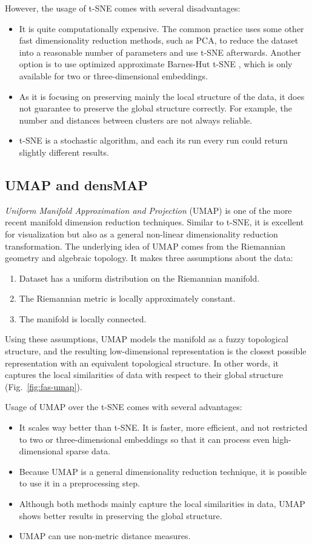 However, the usage of t-SNE comes with several disadvantages:
\begin{itemize}
    \item It is quite computationally expensive. The common practice uses some other fast dimensionality reduction methods, such as PCA, to reduce the dataset into a reasonable number of parameters and use t-SNE afterwards. Another option is to use optimized approximate Barnes-Hut t-SNE \cite{vis:barnes-hut-tsne}, which is only available for two or three-dimensional embeddings.
    \item As it is focusing on preserving mainly the local structure of the data, it does not guarantee to preserve the global structure correctly. For example, the number and distances between clusters are not always reliable.
    \item t-SNE is a stochastic algorithm, and each its run every run could return slightly different results.
\end{itemize}


\subsection{UMAP and densMAP}
\textit{Uniform Manifold Approximation and Projection} (UMAP) \cite{vis:umap} is one of the more recent manifold dimension reduction techniques. Similar to t-SNE, it is excellent for visualization but also as a general non-linear dimensionality reduction transformation. The underlying idea of UMAP comes from the Riemannian geometry and algebraic topology. It makes three assumptions about the data:
\begin{enumerate}
    \item Dataset has a uniform distribution on the Riemannian manifold.
    \item The Riemannian metric is locally approximately constant.
    \item The manifold is locally connected.
\end{enumerate}
Using these assumptions, UMAP models the manifold as a fuzzy topological structure, and the resulting low-dimensional representation is the closest possible representation with an equivalent topological structure. In other words, it captures the local similarities of data with respect to their global structure (Fig.~\ref{fig:fas-umap}).

Usage of UMAP over the t-SNE comes with several advantages:
\begin{itemize}
    \item It scales way better than t-SNE. It is faster, more efficient, and not restricted to two or three-dimensional embeddings so that it can process even high-dimensional sparse data.
    \item Because UMAP is a general dimensionality reduction technique, it is possible to use it in a preprocessing step.
    \item Although both methods mainly capture the local similarities in data, UMAP shows better results in preserving the global structure.
    \item UMAP can use non-metric distance measures.
\end{itemize}

